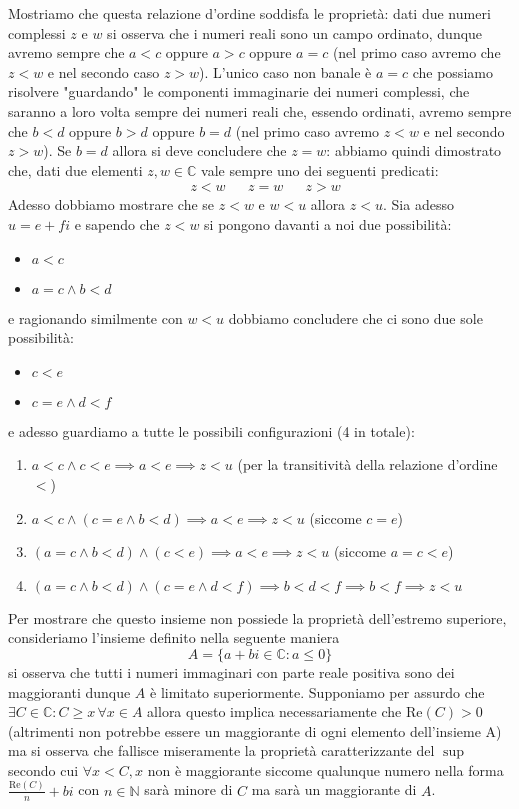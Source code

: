 \documentclass{report}
\begin{document}
\begin{mysolution}
Mostriamo che questa relazione d'ordine soddisfa le proprietà: dati due numeri complessi $z$ e $w$ si osserva che i numeri reali sono un campo ordinato, dunque avremo sempre che $a < c$ oppure $a > c$ oppure $a = c$ (nel primo caso avremo che $z < w$ e nel secondo caso $z > w$). L'unico caso non banale è $a = c$ che possiamo risolvere "guardando" le componenti immaginarie dei numeri complessi, che saranno a loro volta sempre dei numeri reali che, essendo ordinati, avremo sempre che $b<d$ oppure $b>d$ oppure $b=d$ (nel primo caso avremo $z < w$ e nel secondo $z > w$). Se $b=d$ allora si deve concludere che $z=w$: abbiamo quindi dimostrato che, dati due elementi $z, w \in \mathbb{C}$ vale sempre uno dei seguenti predicati:
\begin{align*}
	&z < w & &z=w & &z>w
\end{align*}
Adesso dobbiamo mostrare che se $z < w$ e $w < u$ allora $z < u$. Sia adesso $u = e+fi$ e sapendo che $z < w$ si pongono davanti a noi due possibilità:
\begin{itemize}
	\item $a < c$
	\item $a = c \wedge b < d$ 
\end{itemize}
e ragionando similmente con $w < u$ dobbiamo concludere che ci sono due sole possibilità:
\begin{itemize}
	\item $c < e$
	\item $c = e \wedge d < f$
\end{itemize}
e adesso guardiamo a tutte le possibili configurazioni (4 in totale):
\begin{enumerate}
	\item $a < c \wedge c < e \implies a < e \implies z < u$ (per la transitività della relazione d'ordine $<$)
	\item $a < c \wedge (c=e \wedge b < d) \implies a < e \implies z<u$ (siccome $c=e$)
	\item $(a=c \wedge b<d) \wedge (c < e) \implies a < e \implies z<u$ (siccome $a=c<e$)
	\item $(a=c \wedge b<d) \wedge (c=e \wedge d<f) \implies b<d<f \implies b<f \implies z<u$ 
\end{enumerate}
Per mostrare che questo insieme non possiede la proprietà dell'estremo superiore, consideriamo l'insieme definito nella seguente maniera
$$
A = \{a+bi \in \mathbb{C}: a \leq 0 \}
$$
si osserva che tutti i numeri immaginari con parte reale positiva sono dei maggioranti dunque $A$ è limitato superiormente. Supponiamo per assurdo che $\exists C \in \mathbb{C}: C \geq x \, \forall x \in A$ allora questo implica necessariamente che $\text{Re}(C) > 0$ (altrimenti non potrebbe essere un maggiorante di ogni elemento dell'insieme A) ma si osserva che fallisce miseramente la proprietà caratterizzante del $\sup$ secondo cui $\forall x < C, x$ non è maggiorante siccome qualunque numero nella forma $\frac{\text{Re}(C)}{n} + bi$ con $n \in \mathbb{N}$ sarà minore di $C$ ma sarà un maggiorante di $A$.
\end{mysolution}
\end{document}
